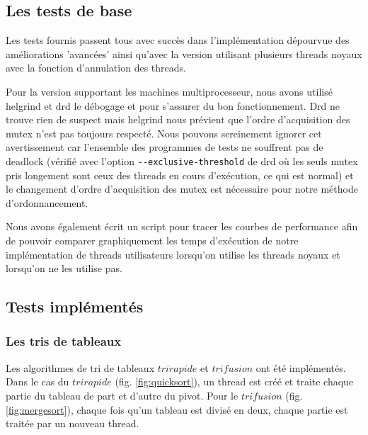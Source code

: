 \subsection{Les tests de base}

Les tests fournis passent tous avec succès dans l'implémentation dépourvue des
améliorations 'avancées' ainsi qu'avec la version utilisant plusieurs threads noyaux avec la fonction d'annulation des threads. 

Pour la version supportant les machines multiprocesseur, nous avons utilisé helgrind et drd le débogage et pour s'assurer du bon fonctionnement. Drd ne trouve rien de suspect mais helgrind nous prévient que l'ordre d'acquisition des mutex n'est pas toujours respecté. Nous pouvons sereinement ignorer cet avertissement car l'ensemble des programmes de tests ne souffrent pas de deadlock (vérifié avec l'option \verb!--exclusive-threshold! de drd où les seuls mutex pris longement sont ceux des threads en cours d'exécution, ce qui est normal) et le changement d'ordre d'acquisition des mutex est nécessaire pour notre méthode d'ordonnancement.

Nous avons également écrit un script pour tracer les courbes de performance
afin de pouvoir comparer graphiquement les temps d'exécution de notre
implémentation de threads utilisateurs lorsqu'on utilise les threads noyaux
et lorsqu'on ne les utilise pas.

\subsection{Tests implémentés}

\subsubsection{Les tris de tableaux} Les algorithmes de tri de tableaux $tri
rapide$ et $tri fusion$ ont été implémentés. Dans le cas du $tri rapide$
(fig. \ref{fig:quicksort}), un thread est créé et traite chaque partie du
tableau de part et d'autre du pivot. Pour le $tri fusion$
(fig. \ref{fig:mergesort}), chaque fois qu'un tableau est divisé en deux,
chaque partie est traitée par un nouveau thread.\\


